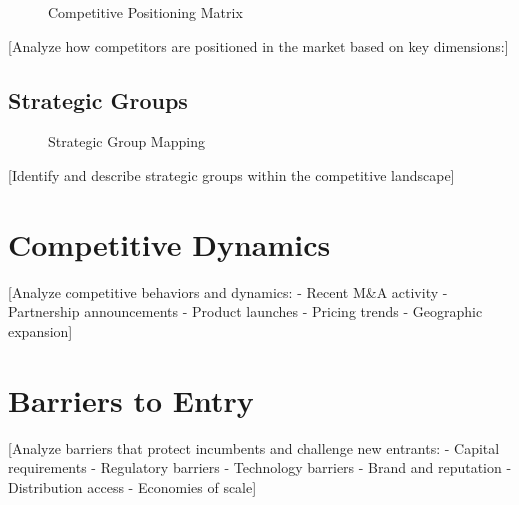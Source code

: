 \documentclass[11pt,letterpaper]{report}
\begin{document}
\begin{figure}[htbp]
\centering
\caption{Competitive Positioning Matrix}
\label{fig:competitive_positioning}
\end{figure}

[Analyze how competitors are positioned in the market based on key dimensions:]

\subsection{Strategic Groups}


\begin{figure}[htbp]
\centering
\caption{Strategic Group Mapping}
\label{fig:strategic_groups}
\end{figure}

[Identify and describe strategic groups within the competitive landscape]

\section{Competitive Dynamics}

[Analyze competitive behaviors and dynamics:
- Recent M\&A activity
- Partnership announcements
- Product launches
- Pricing trends
- Geographic expansion]

\section{Barriers to Entry}

[Analyze barriers that protect incumbents and challenge new entrants:
- Capital requirements
- Regulatory barriers
- Technology barriers
- Brand and reputation
- Distribution access
- Economies of scale]

\end{document}
